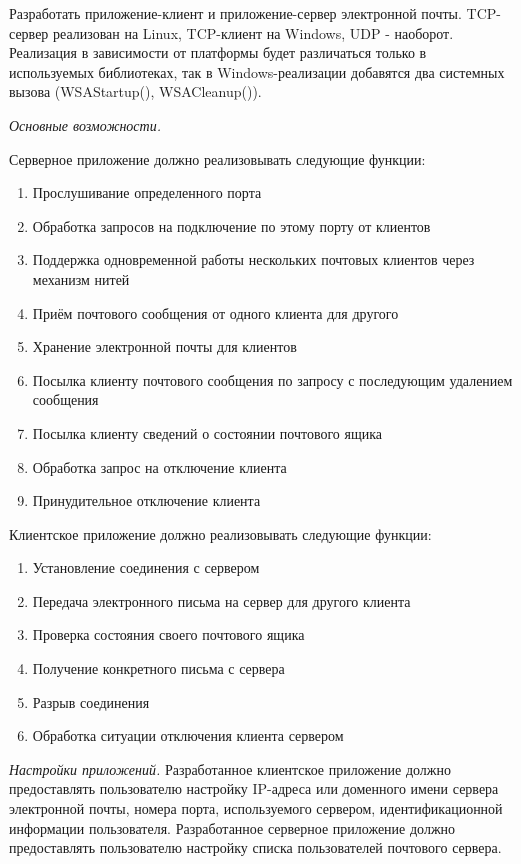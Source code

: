 Разработать приложение-клиент и приложение-сервер электронной почты. TCP-сервер реализован на Linux, TCP-клиент на Windows, UDP - наоборот. Реализация в зависимости от платформы будет различаться только в используемых библиотеках, так в Windows-реализации добавятся два системных вызова (WSAStartup(), WSACleanup()).

\textit{Основные возможности.}

Серверное приложение должно реализовывать следующие функции: 
\begin{enumerate}
\item Прослушивание определенного порта
\item Обработка запросов на подключение по этому порту от клиентов
\item Поддержка одновременной работы нескольких почтовых клиентов через механизм нитей
\item Приём почтового сообщения от одного клиента для другого
\item Хранение электронной почты для клиентов 
\item Посылка клиенту почтового сообщения по запросу с последующим удалением сообщения 
\item Посылка клиенту сведений о состоянии почтового ящика 
\item Обработка запрос на отключение клиента 
\item Принудительное отключение клиента
\end{enumerate}

Клиентское приложение должно реализовывать следующие функции:  
\begin{enumerate}
\item Установление соединения с сервером
\item Передача электронного письма на сервер для другого клиента
\item Проверка состояния своего почтового ящика
\item Получение конкретного письма с сервера
\item Разрыв соединения
\item Обработка ситуации отключения клиента сервером
\end{enumerate}

\textit{Настройки приложений.}
Разработанное клиентское приложение должно предоставлять пользователю настройку IP-адреса или доменного имени сервера электронной почты, номера порта, используемого сервером, идентификационной информации пользователя. Разработанное серверное приложение должно предоставлять пользователю настройку списка пользователей почтового сервера. 

